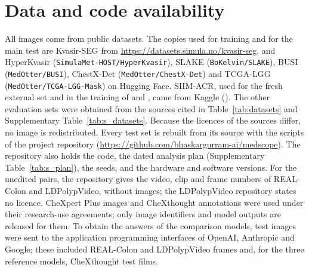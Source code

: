 
\section*{Data and code availability}
{\raggedright
All images come from public datasets. The copies used for training and for the main test are Kvasir-SEG from \url{https://datasets.simula.no/kvasir-seg}, and HyperKvasir (\texttt{SimulaMet-HOST/HyperKvasir}), SLAKE (\texttt{BoKelvin/SLAKE}), BUSI (\texttt{MedOtter/BUSI}), ChestX-Det (\texttt{MedOtter/ChestX-Det}) and TCGA-LGG (\texttt{MedOtter/TCGA-LGG-Mask}) on Hugging Face. SIIM-ACR, used for the fresh external set and in the training of \msp{} and \msn, came from Kaggle (). The other evaluation sets were obtained from the sources cited in Table~\ref{tab:datasets} and Supplementary Table~\ref{tab:s_datasets}. Because the licences of the sources differ, no image is redistributed. Every test set is rebuilt from its source with the scripts of the project repository (\url{https://github.com/bhaskargurram-ai/medscope}). The repository also holds the code, the dated analysis plan (Supplementary Table~\ref{tab:s_plan}), the seeds, and the hardware and software versions. For the unedited pairs, the repository gives the video, clip and frame numbers of REAL-Colon and LDPolypVideo, without images; the LDPolypVideo repository states no licence. CheXpert Plus images and CheXthought annotations were used under their research-use agreements; only image identifiers and model outputs are released for them. To obtain the answers of the comparison models, test images were sent to the application programming interfaces of OpenAI, Anthropic and Google; these included REAL-Colon and LDPolypVideo frames and, for the three reference models, CheXthought test films. 
\par}

